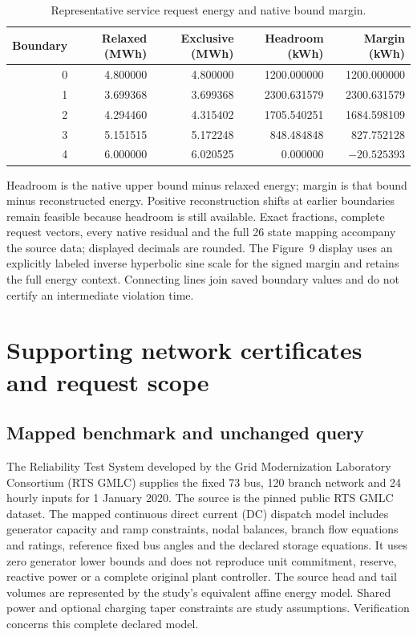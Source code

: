 \begin{table}[htbp]
\caption{Representative service request energy and native bound margin.}
\label{tab:sat_service_energy}
\begin{tabular}{@{}rrrrr@{}}\toprule
Boundary & Relaxed (MWh) & Exclusive (MWh) & Headroom (kWh) & Margin (kWh)\\\midrule
0 & 4.800000 & 4.800000 & 1200.000000 & 1200.000000\\
1 & 3.699368 & 3.699368 & 2300.631579 & 2300.631579\\
2 & 4.294460 & 4.315402 & 1705.540251 & 1684.598109\\
3 & 5.151515 & 5.172248 & 848.484848 & 827.752128\\
4 & 6.000000 & 6.020525 & 0.000000 & $-20.525393$\\\bottomrule
\end{tabular}
\end{table}

Headroom is the native upper bound minus relaxed energy; margin is that
bound minus reconstructed energy. Positive reconstruction shifts at earlier
boundaries remain feasible because headroom is still available. Exact
fractions, complete request vectors, every native residual and the full
26 state mapping accompany the source data; displayed decimals are rounded.
The Figure~9 display uses an explicitly labeled inverse hyperbolic sine
scale for the signed margin and retains the full energy context. Connecting
lines join saved boundary values and do not certify an intermediate
violation time.



\section{Supporting network certificates and request scope}
\label{sec:sat_network_scope}

\subsection{Mapped benchmark and unchanged query}
The Reliability Test System developed by the Grid Modernization Laboratory
Consortium (RTS GMLC) supplies the fixed 73 bus, 120 branch network and
24 hourly inputs for 1 January 2020. The source is the pinned public RTS GMLC dataset\cite{rts_gmlc_source_3ece0d3}.
The mapped continuous direct current (DC) dispatch model includes generator
capacity and ramp constraints, nodal balances, branch flow equations and
ratings, reference fixed bus angles and the declared storage equations.
It uses zero generator lower bounds and does not reproduce unit commitment,
reserve, reactive power or a complete original plant controller. The
source head and tail volumes are represented by the study's equivalent
affine energy model. Shared power and optional charging taper constraints
are study assumptions. Verification concerns this complete declared model.

